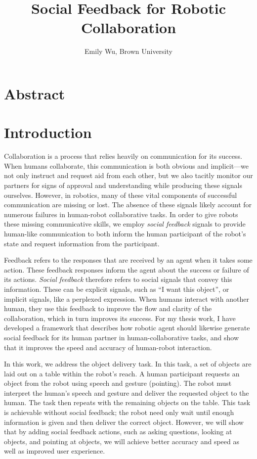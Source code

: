 \documentclass{article}
\title{Social Feedback for Robotic Collaboration}
\author{Emily Wu, Brown University}
\begin{document}
\maketitle

\tableofcontents

\newpage
\section{Abstract}
\newpage

\section{Introduction}

Collaboration is a process that relies heavily on communication for its success. When humans collaborate, this communication is both obvious and implicit---we not only instruct and request aid from each other, but we also tacitly monitor our partners for signs of approval and understanding while producing these signals ourselves. However, in robotics, many of these vital components of successful communication are missing or lost. The absence of these signals likely account for numerous failures in human-robot collaborative tasks. In order to give robots these missing communicative skills, we employ \emph{social feedback} signals to provide human-like communication to both inform the human participant of the robot's state and request information from the participant. 

Feedback refers to the responses that are received by an agent when it takes some action. These feedback responses inform the agent about the success or failure of its actions. \emph{Social feedback} therefore refers to social signals that convey this information. These can be explicit signals, such as ``I want this object'', or implicit signals, like a perplexed expression. When humans interact with another human, they use this feedback to improve the flow and clarity of the collaboration, which in turn improves its success. For my thesis work, I have developed a framework that describes how robotic agent should likewise generate social feedback for its human partner in human-collaborative tasks, and show that it improves the speed and accuracy of human-robot interaction. 

In this work, we address the object delivery task. In this task, a set of objects are laid out on a table within the robot's reach. A human participant requests an object from the robot using speech and gesture (pointing). The robot must interpret the human's speech and gesture and deliver the requested object to the human. The task then repeats with the remaining objects on the table. This task is achievable without social feedback; the robot need only wait until enough information is given and then deliver the correct object. However, we will show that by adding social feedback actions, such as asking questions, looking at objects, and pointing at objects, we will achieve better accuracy and speed as well as improved user experience. 
\end{document}
